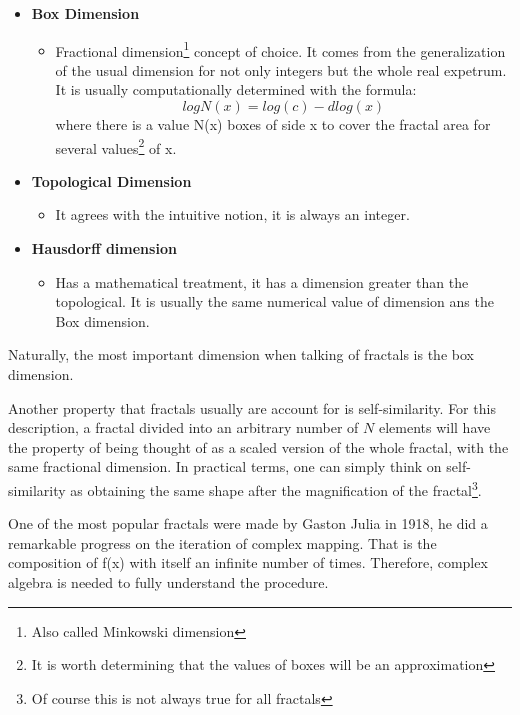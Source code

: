 \documentclass{article}
\begin{document}
\begin{itemize}
    \item \textbf{Box Dimension}
    \begin{itemize}
        \item Fractional dimension\footnote{Also called Minkowski dimension} concept of choice. It comes from the generalization of the usual dimension for not only integers but the whole real expetrum. It is usually computationally determined with the formula:
        \begin{equation}
            log N(x)=log(c)-dlog(x)
        \end{equation}
         where there is a value N(x) boxes of side x to cover the fractal area for several values\footnote{It is worth determining that the values of boxes will be an approximation} of x. 
    \end{itemize}
   
    \item \textbf{Topological Dimension}
    \begin{itemize}
        \item It agrees with the intuitive notion, it is always an integer. 
    \end{itemize}
    \item \textbf{Hausdorff dimension}
    \begin{itemize}
        \item Has a mathematical treatment, it has a dimension greater than the topological. It is usually the same numerical value of dimension ans the Box dimension.
    \end{itemize}
\end{itemize}

Naturally, the most important dimension when talking of fractals is the box dimension.

Another property that fractals usually are account for is self-similarity. For this description, a fractal divided into an arbitrary number of $N$ elements will have the property of being thought of as a scaled version of the whole fractal, with the same fractional dimension\cite{Crownover}. In practical terms, one can simply think on self-similarity as obtaining the same shape after the magnification of the fractal\footnote{Of course this is not always true for all fractals}.

One of the most popular fractals were made by Gaston Julia in 1918, he did a remarkable progress on the iteration of complex mapping. That is the composition of f(x) with itself an infinite number of times. Therefore, complex algebra is needed to fully understand the procedure.
\end{document}
